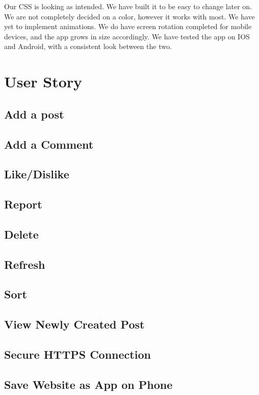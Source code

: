 \documentclass[12pt]{article}
\begin{document}
Our CSS is looking as intended. We have built it to be easy to change later on. We are not completely decided on a color, however it works with most. We have yet to implement animations. We do have screen rotation completed for mobile devices, and the app grows in size accordingly. We have tested the app on IOS and Android, with a consistent look between the two.
\section{User Story}
\subsection{Add a post}

\subsection{Add a Comment}

\subsection{Like/Dislike}

\subsection{Report}

\subsection{Delete}

\subsection{Refresh}

\subsection{Sort}

\subsection{View Newly Created Post}

\subsection{Secure HTTPS Connection}

\subsection{Save Website as App on Phone}
\end{document}
